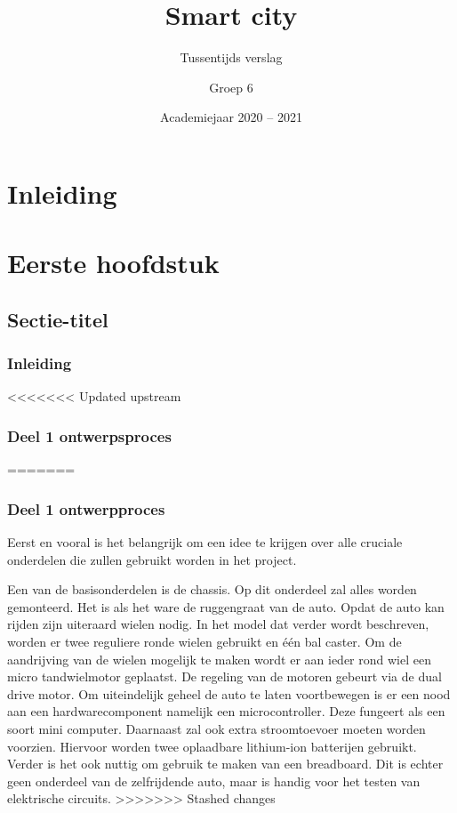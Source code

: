 \documentclass[a4paper,twoside,kulak]{kulakreport} %
\title{Smart city}
\subtitle{Tussentijds verslag}
\author{Groep 6}
\institute{KU Leuven Kulak, Wetenschap \& Technologie}
\date{Academiejaar 2020 -- 2021}
\begin{document}

\titlepage

\tableofcontents

\chapter*{Inleiding}

\chapter{Eerste hoofdstuk}
\section{Sectie-titel}
\subsection*{Inleiding}

<<<<<<< Updated upstream
\subsection{Deel 1 ontwerpsproces}
=======
\subsection{Deel 1 ontwerpproces}
Eerst en vooral is het belangrijk om een idee te krijgen over alle cruciale onderdelen die zullen gebruikt worden in het project. 

Een van de basisonderdelen is de chassis. Op dit onderdeel zal alles worden gemonteerd. Het is als het ware de ruggengraat van de auto. Opdat de auto kan rijden zijn uiteraard wielen nodig. In het model dat verder wordt beschreven, worden er twee reguliere ronde wielen gebruikt en één bal caster. Om de aandrijving van de wielen mogelijk te maken wordt er aan ieder rond wiel een micro tandwielmotor geplaatst. De regeling van de motoren gebeurt via de dual drive motor. Om uiteindelijk geheel de auto te laten voortbewegen is er een nood aan een hardwarecomponent namelijk een microcontroller. Deze fungeert als een soort mini computer. Daarnaast zal ook extra stroomtoevoer moeten worden voorzien. Hiervoor worden twee oplaadbare lithium-ion batterijen gebruikt. Verder is het ook nuttig om gebruik te maken van een breadboard. Dit is echter geen onderdeel van de zelfrijdende auto, maar is handig voor het testen van elektrische circuits.
>>>>>>> Stashed changes
\end{document}
